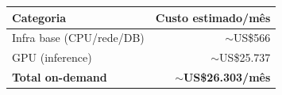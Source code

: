 \begin{table}[h]
\centering
\begin{tabular}{|l|r|}
\hline
\textbf{Categoria} & \textbf{Custo estimado/mês} \\
\hline
Infra base (CPU/rede/DB) & $\sim$US\$566 \\
GPU (inference) & $\sim$US\$25.737 \\
\hline
\textbf{Total on-demand} & \textbf{$\sim$US\$26.303/mês} \\
\hline
\end{tabular}
\end{table}
\newpage